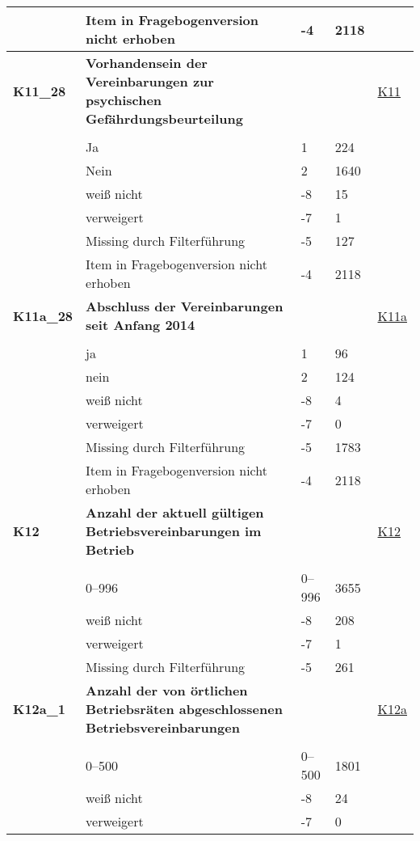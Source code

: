 \begin{longtable}{| L{2.5cm} | L{8.25cm}| C{1.5cm} | R{1.25cm} | C{2.25cm} |  }
   & Item in Fragebogenversion nicht erhoben & -4 & 2118 &  \\ 
   \midrule
\textbf{K11\_28}\label{var:suf:K11:28} & \textbf{Vorhandensein der Vereinbarungen zur psychischen Gefährdungsbeurteilung} &  &  & \hyperref[K11]{K11} \\ 
   &  &  &  &  \\ 
   & Ja & 1 & 224 &  \\ 
   & Nein & 2 & 1640 &  \\ 
   & weiß nicht & -8 & 15 &  \\ 
   & verweigert & -7 & 1 &  \\ 
   & Missing durch Filterführung & -5 & 127 &  \\ 
   & Item in Fragebogenversion nicht erhoben & -4 & 2118 &  \\ 
   \midrule
\textbf{K11a\_28}\label{var:suf:K11a:28} & \textbf{Abschluss der Vereinbarungen seit Anfang 2014} &  &  & \hyperref[K11a]{K11a} \\ 
   &  &  &  &  \\ 
   & ja & 1 & 96 &  \\ 
   & nein & 2 & 124 &  \\ 
   & weiß nicht & -8 & 4 &  \\ 
   & verweigert & -7 & 0 &  \\ 
   & Missing durch Filterführung & -5 & 1783 &  \\ 
   & Item in Fragebogenversion nicht erhoben & -4 & 2118 &  \\ 
   \midrule
\textbf{K12}\label{var:suf:K12} & \textbf{Anzahl der aktuell gültigen Betriebsvereinbarungen im Betrieb} &  &  & \hyperref[K12]{K12} \\ 
   &  &  &  &  \\ 
   & 0--996 & 0--996 & 3655 &  \\ 
   & weiß nicht & -8 & 208 &  \\ 
   & verweigert & -7 & 1 &  \\ 
   & Missing durch Filterführung & -5 & 261 &  \\ 
   \midrule
\textbf{K12a\_1}\label{var:suf:K12a:1} & \textbf{Anzahl der von örtlichen Betriebsräten abgeschlossenen Betriebsvereinbarungen} &  &  & \hyperref[K12a]{K12a} \\ 
   &  &  &  &  \\ 
   & 0--500 & 0--500 & 1801 &  \\ 
   & weiß nicht & -8 & 24 &  \\ 
   & verweigert & -7 & 0 &  \\ 

\end{longtable}
